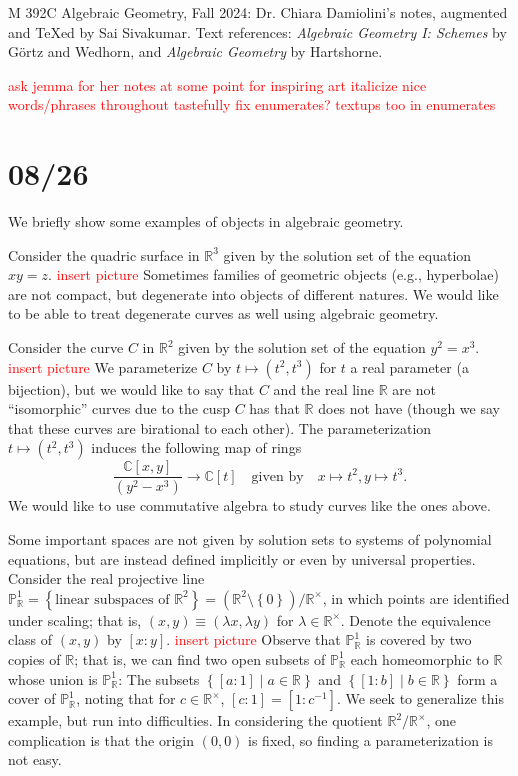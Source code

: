 \documentclass[11pt,leqno]{article}
\newcommand{\sai}[1]{\textcolor{red}{#1}}
\theoremstyle{plain}
\theoremstyle{definition}
\numberwithin{equation}{section}
\numberwithin{lem}{section}
\newcommand{\cbr}[1]{\left\{#1\right\}}
\begin{document}
M 392C Algebraic Geometry, Fall 2024: Dr. Chiara Damiolini's notes, augmented and \TeX ed by Sai Sivakumar. Text references: \textit{Algebraic Geometry I: Schemes} by G\"ortz and Wedhorn, and \textit{Algebraic Geometry} by Hartshorne.

\sai{ask jemma for her notes at some point for inspiring art}
\sai{italicize nice words/phrases throughout tastefully}
\sai{fix enumerates? textups too in enumerates}
\section{08/26}
We briefly show some examples of objects in algebraic geometry.

Consider the quadric surface in $\mathbb R^3$ given by the solution set of the equation $xy = z$.
\sai{insert picture}
Sometimes families of geometric objects (e.g., hyperbolae) are not compact, but degenerate into objects of different natures.
We would like to be able to treat degenerate curves as well using algebraic geometry.

Consider the curve $C$ in $\mathbb R^2$ given by the solution set of the equation $y^2 = x^3$.
\sai{insert picture}
We parameterize $C$ by $t\mapsto (t^2,t^3)$ for $t$ a real parameter (a bijection), but we would like to say that $C$ and the real line $\mathbb R$ are not ``isomorphic'' curves due to the cusp $C$ has that $\mathbb R$ does not have (though we say that these curves are birational to each other). The parameterization $t\mapsto (t^2, t^3)$ induces the following map of rings
\begin{equation}
  \frac{\mathbb C[x,y]}{(y^2-x^3)}\to \mathbb C[t]\quad \text{given by}\quad  x\mapsto t^2, y\mapsto t^3.
\end{equation}
We would like to use commutative algebra to study curves like the ones above.

Some important spaces are not given by solution sets to systems of polynomial equations, but are instead defined implicitly or even by universal properties.
Consider the real projective line $\mathbb P_{\mathbb R}^1 = \cbr{\text{linear subspaces of }\mathbb R^2} = (\mathbb R^2\setminus\cbr{0})/\mathbb R^\times$, in which points are identified under scaling; that is, $(x,y)\equiv (\lambda x,\lambda y)$ for $\lambda\in \mathbb R^\times$. Denote the equivalence class of $(x,y)$ by $[x:y]$. \sai{insert picture}
Observe that $\mathbb P_{\mathbb R}^1$ is covered by two copies of $\mathbb R$; that is, we can find two open subsets of $\mathbb P_{\mathbb R}^1$ each homeomorphic to $\mathbb R$ whose union is $\mathbb P_{\mathbb R}^1$: The subsets $\cbr{[a:1]\mid a\in\mathbb R}$ and $\cbr{[1:b]\mid b\in \mathbb R}$ form a cover of $\mathbb P_{\mathbb R}^1$, noting that for $c\in\mathbb R^\times$, $[c:1] = [1:c^{-1}]$.
We seek to generalize this example, but run into difficulties. 
In considering the quotient $\mathbb R^2/\mathbb R^\times$, one complication is that the origin $(0,0)$ is fixed, so finding a parameterization is not easy.
\end{document}
